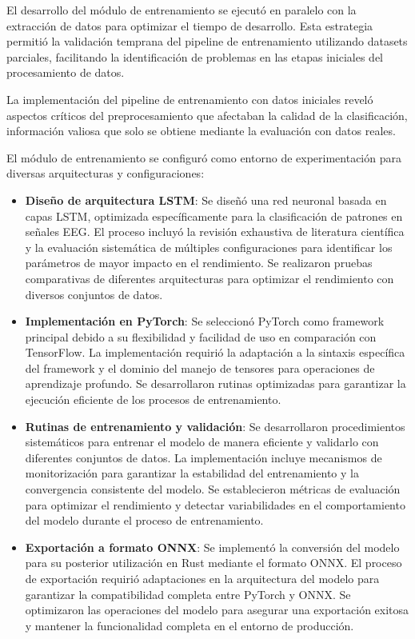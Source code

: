 El desarrollo del módulo de entrenamiento se ejecutó en paralelo con la extracción de datos para optimizar el tiempo de desarrollo. Esta estrategia permitió la validación temprana del pipeline de entrenamiento utilizando datasets parciales, facilitando la identificación de problemas en las etapas iniciales del procesamiento de datos.

La implementación del pipeline de entrenamiento con datos iniciales reveló aspectos críticos del preprocesamiento que afectaban la calidad de la clasificación, información valiosa que solo se obtiene mediante la evaluación con datos reales.

El módulo de entrenamiento se configuró como entorno de experimentación para diversas arquitecturas y configuraciones:

\begin{itemize}
    \item \textbf{Diseño de arquitectura LSTM}: Se diseñó una red neuronal basada en capas LSTM, optimizada específicamente para la clasificación de patrones en señales EEG. El proceso incluyó la revisión exhaustiva de literatura científica y la evaluación sistemática de múltiples configuraciones para identificar los parámetros de mayor impacto en el rendimiento. Se realizaron pruebas comparativas de diferentes arquitecturas para optimizar el rendimiento con diversos conjuntos de datos.
    
    \item \textbf{Implementación en PyTorch}: Se seleccionó PyTorch como framework principal debido a su flexibilidad y facilidad de uso en comparación con TensorFlow. La implementación requirió la adaptación a la sintaxis específica del framework y el dominio del manejo de tensores para operaciones de aprendizaje profundo. Se desarrollaron rutinas optimizadas para garantizar la ejecución eficiente de los procesos de entrenamiento.
    
    \item \textbf{Rutinas de entrenamiento y validación}: Se desarrollaron procedimientos sistemáticos para entrenar el modelo de manera eficiente y validarlo con diferentes conjuntos de datos. La implementación incluye mecanismos de monitorización para garantizar la estabilidad del entrenamiento y la convergencia consistente del modelo. Se establecieron métricas de evaluación para optimizar el rendimiento y detectar variabilidades en el comportamiento del modelo durante el proceso de entrenamiento.
    
    \item \textbf{Exportación a formato ONNX}: Se implementó la conversión del modelo para su posterior utilización en Rust mediante el formato ONNX. El proceso de exportación requirió adaptaciones en la arquitectura del modelo para garantizar la compatibilidad completa entre PyTorch y ONNX. Se optimizaron las operaciones del modelo para asegurar una exportación exitosa y mantener la funcionalidad completa en el entorno de producción.
\end{itemize}

